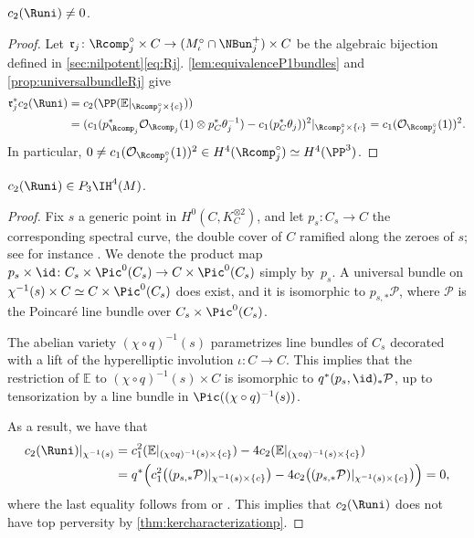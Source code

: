 \begin{lem}
\label{lem:c2neqzero}$c_2(\Runi) \neq 0$.
\end{lem}
\begin{proof}
Let $\mathfrak{r}_j\colon\Rcomp^{\circ}_j \times C \to (M^{\circ}_{\iota} \cap \NBun^{+}_j) \times C$ be the algebraic bijection defined in \ref{sec:nilpotent}\eqref{eq:Rj}. \cref{lem:equivalenceP1bundles} and \cref{prop:universalbundleRj} give
\begin{align*}
\mathfrak{r}^*_j c_2(\Runi) & = c_2(\PP(\mathbb{E}|_{\Rcomp^{\circ}_j \times \{c\}})) \\
& = (c_1(p_{\Rcomp_j}^* \mathcal{O}_{\Rcomp_j}(1)\otimes p_C^*\theta^{-1}_j) - c_1(p_C^*\theta_j))^2|_{\Rcomp^{\circ}_j \times \{c\}}= c_1(\mathcal{O}_{\Rcomp^{\circ}_j}(1))^2.
\end{align*}
In particular, $0 \neq c_1(\mathcal{O}_{\Rcomp^{\circ}_j}(1))^2 \in H^4(\Rcomp^{\circ}_j) \simeq H^4(\PP^3)$.
\end{proof}

\begin{lem}\label{lem:c2Rperversity3}
$c_2(\Runi) \in P_3 \IH^4(M)$.
\end{lem}
\begin{proof}
Fix $s$ a generic point in $H^0(C, K_C^{\otimes 2})$, and let $p_s \colon C_s \to C$ the corresponding spectral curve, \ie the double cover of $C$ ramified along the zeroes of $s$; see for instance \cite[\S 3]{BNR89}. We denote the product map $p_s \times \id\colon C_s \times \Pic^0(C_s)\to C \times \Pic^0(C_s)$ simply by~$p_s$. A universal bundle on $\chi^{-1}(s) \times C \simeq C \times \Pic^0(C_s)$ does exist, and it is isomorphic to $p_{s, *} \mathcal{P}$, where $\mathcal{P}$ is the Poincaré line bundle over $C_s \times \Pic^0(C_s)$.

The abelian variety $(\chi \circ q)^{-1}(s)$ parametrizes line bundles of $C_s$ decorated with a lift of the hyperelliptic involution $\iota\colon C \to C$. This implies that the restriction of $\mathbb{E}$ to $(\chi \circ q)^{-1}(s) \times C$ is isomorphic to $q^* (p_{s}, \id)_* \mathcal{P}$, up to tensorization by a line bundle in $\Pic((\chi \circ q)^{-1}(s))$.

As a result, we have that
\begin{align*}
c_2(\Runi)|_{\chi^{-1}(s)} & = c^2_1(\mathbb{E}|_{(\chi \circ q)^{-1}(s) \times \{c\}})-4c_2(\mathbb{E}|_{(\chi \circ q)^{-1}(s) \times \{c\}})\\
& = q^*\Big(c^2_1\big((p_{s,*} \mathcal{P})|_{\chi ^{-1}(s) \times \{c\}}\big) - 4c_2\big((p_{s,*} \mathcal{P})|_{\chi ^{-1}(s) \times \{c\}}\big)\Big)=0,
\end{align*}
where the last equality follows from \cite[\S 4]{Thaddeus89} or \cite[Eq.\,(5.1.10) \& (5.1.11)]{deCataldoHauselMigliorini2012}.
This implies that $c_2(\Runi)$ does not have top perversity by \cref{thm:kercharacterizationp}.
\end{proof}


